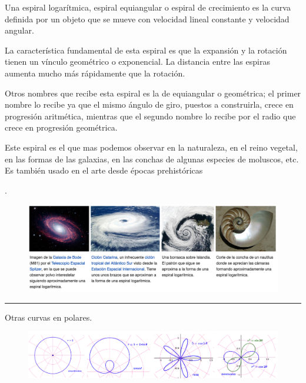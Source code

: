 \begin{small}
Una espiral logarítmica, espiral equiangular o espiral de crecimiento es la curva definida por un objeto que se mueve con velocidad lineal constante y velocidad angular.

La característica fundamental de esta espiral es que la expansión y la rotación tienen un vínculo geométrico o exponencial. La distancia entre las espiras aumenta mucho más rápidamente que la rotación.

Otros nombres que recibe esta espiral es la de equiangular o geométrica; el primer nombre lo recibe ya que el mismo ángulo de giro, puestos a construirla, crece en progresión aritmética, mientras que el segundo nombre lo recibe por el radio que crece en progresión geométrica.

Este espiral es el que mas podemos observar en la naturaleza, en el reino vegetal, en las formas de las galaxias, en las conchas de algunas especies de moluscos, etc. Es también usado en el arte desde épocas prehistóricas\end{small}\normalsize{.}
	
\begin{figure}[H]
	\centering
\includegraphics[width=.95\textwidth]{img-polares/polares53.png}
\end{figure}

\vspace{-15mm}
\begin{flushright}
\rule{250pt}{0.2pt}		
\end{flushright}

\color{black}
\vspace{5mm}
\large{Otras curvas en polares}\normalsize{.}
	
	
\begin{figure}[H]
	\centering
	\includegraphics[width=1\textwidth]{img-polares/polares29.png}
\end{figure}

